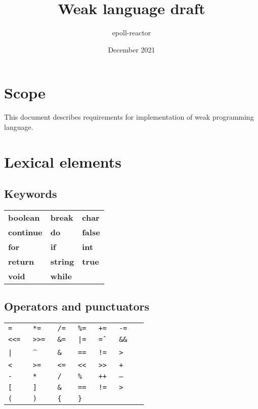 \documentclass{article}
\title{Weak language draft}
\author{epoll-reactor}
\date{December 2021}
\begin{document}
	\pagestyle{fancy}
	\rhead{\leftmark}
	
	\maketitle
	\tableofcontents
	
	\newpage
	
	\section{Scope}
		This document describes requirements for implementation of weak
		programming language.
		
	\section{Lexical elements}
		\upshape
		
		\subsection{Keywords}
			\begin{tabular}{ R{3cm} R{3cm} R{3cm} }
				\textbf{boolean}  & \textbf{break}  & \textbf{char}   \\
				\textbf{continue} & \textbf{do }    & \textbf{false}  \\
				\textbf{for}      & \textbf{if}     & \textbf{int}    \\
				\textbf{return}   & \textbf{string} & \textbf{true}   \\
				\textbf{void}     & \textbf{while}  &                 \\
			\end{tabular}
		
		\subsection{Operators and punctuators}
			\begin{tabular}{ R{1.5cm} R{1.5cm} R{1.5cm} R{1.5cm} R{1.5cm} R{1.5cm} R{1.5cm} }
				\tt{=}   & \tt{*=}     & \tt{/=}  & \tt{\%=} & \tt{+=}  & \tt{-=}   \\
				\tt{<<=} & \tt{>>=}    & \tt{\&=} & \tt{|=}  & \tt{\^=} & \tt{\&\&} \\
				\tt{|}   & \textbf{\^} & \tt{\&}  & \tt{==}  & \tt{!=}  & \tt{>}    \\
				\tt{<}   & \tt{>=}     & \tt{<=}  & \tt{<<}  & \tt{>>}  & \tt{+}    \\
				\tt{-}   & \tt{*}      & \tt{/}   & \tt{\%}  & \tt{++}  & \tt{--}   \\
				\tt{[}   & \tt{]}      & \tt{\&}  & \tt{==}  & \tt{!=}  & \tt{>}    \\
				\tt{(}   & \tt{)}      & \tt{\{}  & \tt{\}}  &          &           \\
			\end{tabular}
		
\end{document}
